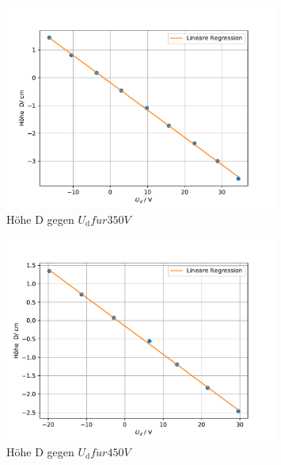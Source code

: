 \begin{figure}[h!]
  \centering
  \includegraphics[width=0.8\textwidth]{350V.pdf}
  \caption{Höhe D gegen $U_{\text{d}} f\ddot{u}r 350V$}
  \label{fig:350V}
\end{figure}

\begin{figure}[h!]
  \centering
  \includegraphics[width=0.8\textwidth]{450V.pdf}
  \caption{Höhe D gegen $U_{\text{d}} f\ddot{u}r 450V$}
  \label{fig:450V}
\end{figure}

